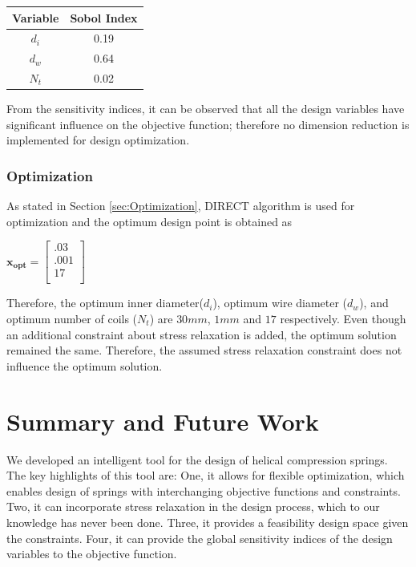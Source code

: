 \documentclass[10pt]{article}
\begin{document}
		 \begin{center}
	 \begin{tabular}{| c  | c |  }
	 	\hline Variable & Sobol Index\\
	 	\hline $d_{i}$ & 0.19 \\
		\hline $d_{w}$ & 0.64  \\
		\hline $N_{t}$ & 0.02 \\ 
		\hline
	 \end{tabular}
\end{center}

From the sensitivity indices, it can be observed that all the design variables have significant influence on the objective function; therefore no dimension reduction is implemented for design optimization. 


\subsubsection{Optimization}
	
	As stated in Section \ref{sec:Optimization}, DIRECT algorithm is used for optimization and the optimum design point is obtained as 
	\begin{center}
	$\mathbf{x_{opt}} =
	\left[
	\begin{array}{c}
	 	 .03 \\
	 	 .001 \\
		 17    \\ 
		
	 \end{array}
	 \right]
$	
\end{center}
    Therefore, the optimum inner diameter($d_{i}$), optimum wire diameter ($d_{w}$), and optimum number of coils ($N_{t}$) are $30 mm$, $1 mm$ and $17$ respectively. Even though an additional constraint about stress relaxation is added, the optimum solution remained the same. Therefore, the assumed stress relaxation constraint does not influence the optimum solution.
    
\section{Summary and Future Work}
\label{sec:Summary}

We developed an intelligent tool for the design of helical compression springs. The key highlights of this tool are: One, it allows for flexible optimization, which enables design of springs with interchanging objective functions and constraints. Two, it can incorporate stress relaxation in the design process, which to our knowledge has never been done. Three, it provides a feasibility design space given the constraints. Four, it can provide the global sensitivity indices of the design variables to the objective function. 
\end{document}
